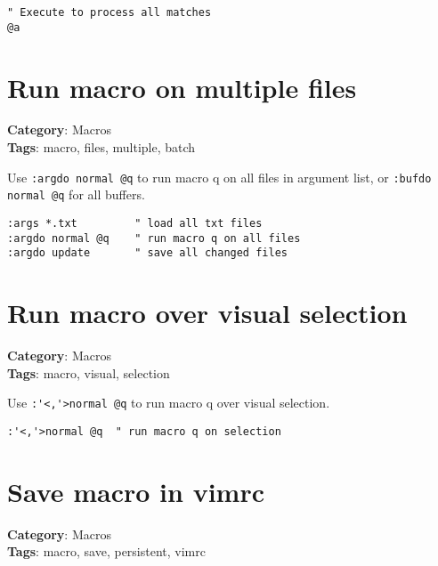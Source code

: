 {{{{{{{\begin{Exa*}{}
\begin{Verbatim}[fontsize=\footnotesize, breaklines, breakanywhere]
" Execute to process all matches
@a
\end{Verbatim}
\end{Exa*}

\section{Run macro on multiple files}

\textbf{Category}: Macros\\ \textbf{Tags}: macro, files, multiple, batch
\vspace{0.5cm}

Use {\footnotesize \Verb§:argdo normal @q§} to run macro q on all files in argument list, or {\footnotesize \Verb§:bufdo normal @q§} for all buffers.

\begin{Exa*}{}
\begin{Verbatim}[fontsize=\footnotesize, breaklines, breakanywhere]
:args *.txt         " load all txt files
:argdo normal @q    " run macro q on all files
:argdo update       " save all changed files
\end{Verbatim}
\end{Exa*}

\section{Run macro over visual selection}

\textbf{Category}: Macros\\ \textbf{Tags}: macro, visual, selection
\vspace{0.5cm}

Use {\footnotesize \Verb§:'<,'>normal @q§} to run macro q over visual selection.

\begin{Exa*}{}
\begin{Verbatim}[fontsize=\footnotesize, breaklines, breakanywhere]
:'<,'>normal @q  " run macro q on selection
\end{Verbatim}
\end{Exa*}

\section{Save macro in vimrc}

\textbf{Category}: Macros\\ \textbf{Tags}: macro, save, persistent, vimrc
\vspace{0.5cm}

}}}}}}}
